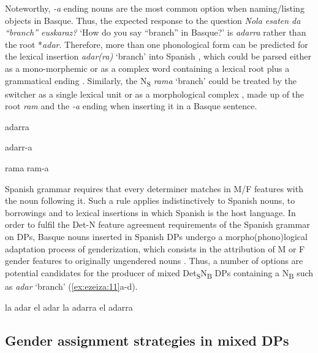 \documentclass[output=paper]{langscibook}
\begin{document}
Noteworthy, \textit{-a} {ending nouns are the most common option when naming/listing objects in Basque. Thus, the expected response to the question} {\textit{Nola esaten da “branch” euskaraz?}} {‘How do you say “branch” in Basque?’ is} {\textit{adarra}} { rather than the root *}{\textit{adar}}{. Therefore, more than one phonological form can be predicted for the lexical insertion} {\textit{adar(ra)}} {‘branch’ into Spanish , which could be parsed either as a mono-morphemic  or as a complex word containing a lexical root plus a grammatical ending . Similarly, the N}{\textsubscript{S}} {\textit{rama}} {‘branch’ could be treated by the switcher as a single lexical unit  or as a morphological complex , made up of the root} {\textit{ram}} {and the} {\textit{-a}} {ending when inserting it in a Basque sentence.}

\ea\label{ex:ezeiza:9}
\ea\label{ex:ezeiza:9a} adarra

\ex\label{ex:ezeiza:9b} adarr-a
\z
\z

\ea\label{ex:ezeiza:10}
\ea\label{ex:ezeiza:10a} rama
\ex\label{ex:ezeiza:10b} ram-a
\z
\z

Spanish grammar requires that every determiner matches in M/F features with the noun following it. Such a rule applies indistinctively to Spanish nouns, to borrowings and to lexical insertions in which Spanish is the host language. In order to fulfil the Det-N feature agreement requirements of the Spanish grammar on DPs, Basque nouns inserted in Spanish DPs undergo a morpho(phono)logical adaptation process of genderization, which consists in the attribution of M or F gender features to originally ungendered nouns \citep{Lopez2020}. Thus, a number of options are potential candidates for the producer of mixed Det\textsubscript{S}N\textsubscript{B} DPs containing a N\textsubscript{B} such as \textit{adar} ‘branch’ (\ref{ex:ezeiza:11}a-d).

\ea
\label{ex:ezeiza:11}

\ea la adar
\ex el adar
\ex la adarra
\ex el adarra
\z
\z

\subsection{Gender assignment strategies in mixed DPs}\label{sec:ezeiza:2.2}
\end{document}
